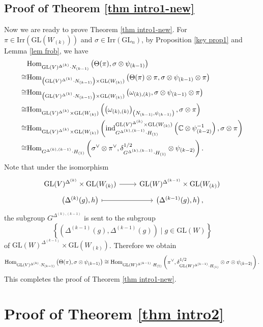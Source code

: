 \documentclass[11pt,reqno]{amsart}
\renewcommand{\1}{{\mathbf{1}}} \newcommand{\sB}{{\mathscr{B}}}
\newcommand{\BC}{{\mathbb {C}}} \newcommand{\BD}{{\mathbb {D}}}
\newcommand{\GL}{{\mathrm{GL}}}\newcommand{\G}{{\mathrm{G}}}
\newcommand{\Irr}{{\mathrm{Irr}}} \newcommand{\cInd}{{\mathrm{c-Ind}}}
\theoremstyle{plain}
\theoremstyle{definition}
\numberwithin{equation}{section}
\begin{document}
\subsection{Proof of Theorem \ref{thm intro1-new}} Now we are ready to prove Theorem \ref{thm intro1-new}.  For $\pi\in\Irr(\GL(W_{(k)}))$ and $\sigma\in\Irr(\GL_n)$,
by Proposition \ref{key prop1} and Lemma \ref{lem frob}, we have
$$\begin{aligned}&\Hom_{\GL(V)^{\Delta^{(k)}}\cdot N_{(k-1)}}\left(\Theta(\pi),\sigma\otimes\psi_{(k-1)}\right)\\
\cong&\Hom_{\left(\GL(V)^{\Delta^{(k)}}\cdot N_{(k-1)}\right)\times\GL(W_{(k)})}\left(\Theta(\pi)\otimes\pi,\sigma\otimes\psi_{(k-1)}\otimes\pi\right)\\
\cong&\Hom_{\left(\GL(V)^{\Delta^{(k)}}\cdot N_{(k-1)}\right)\times\GL(W_{(k)})}\left(\omega_{(k),(k)},\sigma\otimes\psi_{(k-1)}\otimes\pi\right)\\
\cong&\Hom_{\GL(V)^{\Delta^{(k)}}\times\GL(W_{(k)})}\left(\left(\omega_{(k),(k)}\right)_{\left(N_{(k-1)},\psi_{(k-1)}\right)},\sigma\otimes\pi\right)\\
\cong&\Hom_{\GL(V)^{\Delta^{(k)}}\times\GL(W_{(k)})}\left(\ind_{G^{\Delta^{(k),(k-1)}}\cdot H_{(1)}}^{\GL(V)^{\Delta^{(k)}}\times\GL(W_{(k)})}\left(\BC\otimes\psi_{(k-2)}^{-1}\right),\sigma\otimes\pi\right)\\
\cong&\Hom_{G^{\Delta^{(k),(k-1)}}\cdot H_{(1)}}\left(\sigma^\vee\otimes\pi^\vee,\delta_{G^{\Delta^{(k),(k-1)}}\cdot H_{(1)}}^{1/2}\otimes\psi_{(k-2)}\right).
\end{aligned}$$
Note that under the isomorphism
$$\begin{tikzcd}[row sep=0.1cm]
	\GL(V)^{\Delta^{(k)}}\times\GL(W_{(k)}) & \GL(W)^{\Delta^{(k-1)}}\times\GL(W_{(k)}) \\
	\left(\Delta^{(k)}(g),h\right) & \left(\Delta^{(k-1)}(g),h\right),
	\arrow[from=1-1, to=1-2]
	\arrow[maps to, from=2-1, to=2-2]
\end{tikzcd}$$
the subgroup $G^{\Delta^{(k),(k-1)}}$ is sent to the subgroup $$\left\{(\Delta^{(k-1)}(g),\Delta^{(k-1)}(g))\mid g\in\GL(W)\right\}$$ of $\GL(W)^{\Delta^{(k-1)}}\times\GL(W_{(k)})$. Therefore we obtain
$$\Hom_{\GL(V)^{\Delta^{(k)}}\cdot N_{(k-1)}}\left(\Theta(\pi),\sigma\otimes\psi_{(k-1)}\right)\cong\Hom_{\GL(W)^{\Delta^{(k-1)}}\cdot H_{(1)}}\left(\pi^\vee,\delta_{\GL(W)^{\Delta^{(k-1)}}\cdot H_{(1)}}^{1/2}\otimes\sigma\otimes\psi_{(k-2)}\right).$$
This completes the proof of Theorem \ref{thm intro1-new}. 

\section{Proof of Theorem \ref{thm intro2}}
\end{document}
